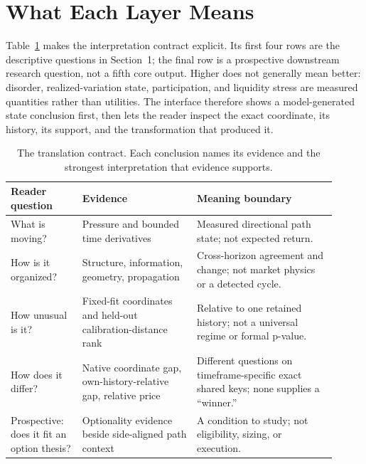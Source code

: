 \documentclass{article}
\begin{document}
\section{What Each Layer Means}
\label{sec:reader-contract}

Table~\ref{tab:questions} makes the interpretation contract explicit. Its first four rows are the descriptive questions in Section~1; the final row is a prospective downstream research question, not a fifth core output. Higher does not generally mean better: disorder, realized-variation state, participation, and liquidity stress are measured quantities rather than utilities. The interface therefore shows a model-generated state conclusion first, then lets the reader inspect the exact coordinate, its history, its support, and the transformation that produced it.

\begin{table}[t]
\centering
\small
\setlength{\tabcolsep}{3.5pt}
\begin{tabular}{p{0.20\linewidth}p{0.32\linewidth}p{0.39\linewidth}}
\toprule
Reader question & Evidence & Meaning boundary \\
\midrule
What is moving? & Pressure and bounded time derivatives & Measured directional path state; not expected return. \\
How is it organized? & Structure, information, geometry, propagation & Cross-horizon agreement and change; not market physics or a detected cycle. \\
How unusual is it? & Fixed-fit coordinates and held-out calibration-distance rank & Relative to one retained history; not a universal regime or formal p-value. \\
How does it differ? & Native coordinate gap, own-history-relative gap, relative price & Different questions on timeframe-specific exact shared keys; none supplies a ``winner.'' \\
\midrule
Prospective: does it fit an option thesis? & Optionality evidence beside side-aligned path context & A condition to study; not eligibility, sizing, or execution. \\
\bottomrule
\end{tabular}
\caption{The translation contract. Each conclusion names its evidence and the strongest interpretation that evidence supports.}
\label{tab:questions}
\end{table}
\end{document}
